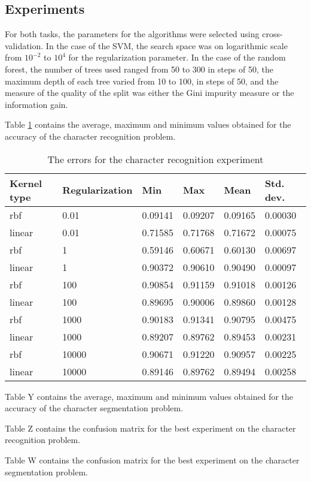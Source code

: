 \subsection{Experiments}

For both tasks, the parameters for the algorithms were selected using cross-validation. In the case of the SVM, the search space was on logarithmic scale from $10^{-2}$ to $10^4$ for the regularization parameter. In the case of the random forest, the number of trees used ranged from 50 to 300 in steps of 50, the maximum depth of each tree varied from 10 to 100, in steps of 50, and the measure of the quality of the split was either the Gini impurity measure or the information gain. 

Table \ref{table:recog_values} contains the average, maximum and minimum values obtained for the accuracy of the character recognition problem.

\begin{table}[h]
\caption{The errors for the character recognition experiment}
\label{table:recog_values}
\begin{tabular}{llllll}
\hline
Kernel type & Regularization & Min     & Max     & Mean    & Std. dev. \\ \hline
rbf & 0.01 & 0.09141 & 0.09207 & 0.09165 & 0.00030 \\ 
linear & 0.01 & 0.71585 & 0.71768 & 0.71672 & 0.00075 \\ 
rbf & 1 & 0.59146 & 0.60671 & 0.60130 & 0.00697 \\ 
linear & 1 & 0.90372 & 0.90610 & 0.90490 & 0.00097 \\ 
rbf & 100 & 0.90854 & 0.91159 & 0.91018 & 0.00126 \\ 
linear & 100 & 0.89695 & 0.90006 & 0.89860 & 0.00128 \\ 
rbf & 1000 & 0.90183 & 0.91341 & 0.90795 & 0.00475 \\ 
linear & 1000 & 0.89207 & 0.89762 & 0.89453 & 0.00231 \\ 
rbf & 10000 & 0.90671 & 0.91220 & 0.90957 & 0.00225 \\ 
linear & 10000 & 0.89146 & 0.89762 & 0.89494 & 0.00258 \\ \hline
\end{tabular}
\end{table}

Table Y contains the average, maximum and minimum values obtained for the accuracy of the character segmentation problem.

Table Z contains the confusion matrix for the best experiment on the character recognition problem.

Table W contains the confusion matrix for the best experiment on the character segmentation problem.
